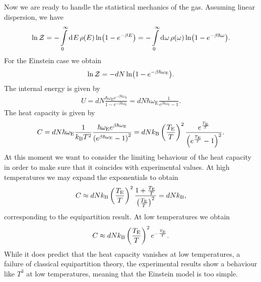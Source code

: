 Now we are ready to handle the statistical mechanics of the gas. Assuming linear dispersion, we have
\begin{align*}
	\ln{\mathcal{Z}} = -\int\limits_{0}^{\infty}\dd[]{E}\rho(E)\ln(1 - e^{-\beta E}) = -\int\limits_{0}^{\infty}\dd[]{\omega}\rho(\omega)\ln(1 - e^{-\beta\hbar\omega}).
\end{align*}
For the Einstein case we obtain
\begin{align*}
	\ln{\mathcal{Z}} = -dN\ln(1 - e^{-\beta\hbar\omega_{\text{E}}}).
\end{align*}
The internal energy is given by
\begin{align*}
	U = dN\frac{\hbar\omega_{\text{E}}e^{-\beta\hbar\omega_{\text{E}}}}{1 - e^{-\beta\hbar\omega_{\text{E}}}} = dN\hbar\omega_{\text{E}}\frac{1}{e^{\beta\hbar\omega_{\text{E}}} - 1}.
\end{align*}
The heat capacity is given by
\begin{align*}
	C = dN\hbar\omega_{\text{E}}\frac{1}{k_{\text{B}} T^{2}}\frac{\hbar\omega_{\text{E}}e^{\beta\hbar\omega_{\text{E}}}}{\left(e^{\beta\hbar\omega_{\text{E}}} - 1\right)^{2}} = dNk_{\text{B}}\left(\frac{T_{\text{E}}}{T}\right)^{2}\frac{e^{\frac{T_{\text{E}}}{T}}}{\left(e^{\frac{T_{\text{E}}}{T}} - 1\right)^{2}}.
\end{align*}
At this moment we want to consider the limiting behaviour of the heat capacity in order to make sure that it coincides with experimental values. At high temperatures we may expand the exponentials to obtain
\begin{align*}
	C \approx dNk_{\text{B}}\left(\frac{T_{\text{E}}}{T}\right)^{2}\frac{1 + \frac{T_{\text{E}}}{T}}{\left(\frac{T_{\text{E}}}{T}\right)^{2}} = dNk_{\text{B}},
\end{align*}
corresponding to the equipartition result. At low temperatures we obtain
\begin{align*}
	C \approx dNk_{\text{B}}\left(\frac{T_{\text{E}}}{T}\right)^{2}e^{-\frac{T_{\text{E}}}{T}}.
\end{align*}
While it does predict that the heat capacity vanishes at low temperatures, a failure of classical equipartition theory, the experimental results show a behaviour like $T^{3}$ at low temperatures, meaning that the Einstein model is too simple.

